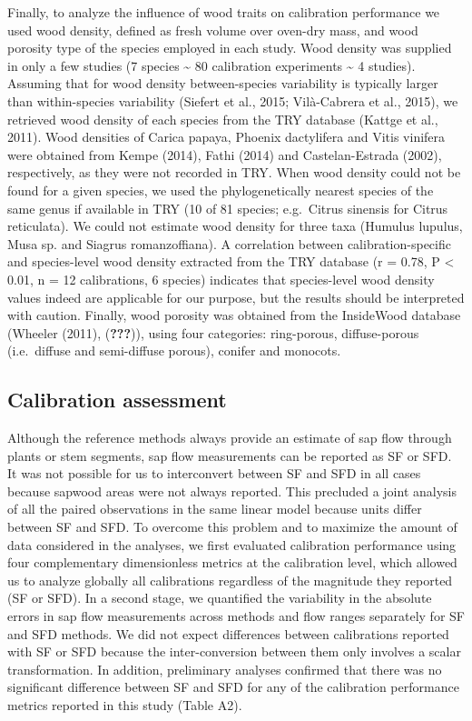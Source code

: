 \documentclass[11pt,twoside]{reedthesis}
\begin{document}
Finally, to analyze the influence of wood traits on calibration
performance we used wood density, defined as fresh volume over oven-dry
mass, and wood porosity type of the species employed in each study. Wood
density was supplied in only a few studies (7 species \textasciitilde{}
80 calibration experiments \textasciitilde{} 4 studies). Assuming that
for wood density between-species variability is typically larger than
within-species variability (Siefert et al., 2015; Vilà-Cabrera et al.,
2015), we retrieved wood density of each species from the TRY database
(Kattge et al., 2011). Wood densities of Carica papaya, Phoenix
dactylifera and Vitis vinifera were obtained from Kempe (2014), Fathi
(2014) and Castelan-Estrada (2002), respectively, as they were not
recorded in TRY. When wood density could not be found for a given
species, we used the phylogenetically nearest species of the same genus
if available in TRY (10 of 81 species; e.g.~Citrus sinensis for Citrus
reticulata). We could not estimate wood density for three taxa (Humulus
lupulus, Musa sp. and Siagrus romanzoffiana). A correlation between
calibration-specific and species-level wood density extracted from the
TRY database (r = 0.78, P \textless{} 0.01, n = 12 calibrations, 6
species) indicates that species-level wood density values indeed are
applicable for our purpose, but the results should be interpreted with
caution. Finally, wood porosity was obtained from the InsideWood
database (Wheeler (2011), ({\textbf{???}})), using four categories:
ring-porous, diffuse-porous (i.e.~diffuse and semi-diffuse porous),
conifer and monocots.\par

\subsection{Calibration assessment}\label{calibration-assessment}

Although the reference methods always provide an estimate of sap flow
through plants or stem segments, sap flow measurements can be reported
as SF or SFD. It was not possible for us to interconvert between SF and
SFD in all cases because sapwood areas were not always reported. This
precluded a joint analysis of all the paired observations in the same
linear model because units differ between SF and SFD. To overcome this
problem and to maximize the amount of data considered in the analyses,
we first evaluated calibration performance using four complementary
dimensionless metrics at the calibration level, which allowed us to
analyze globally all calibrations regardless of the magnitude they
reported (SF or SFD). In a second stage, we quantified the variability
in the absolute errors in sap flow measurements across methods and flow
ranges separately for SF and SFD methods. We did not expect differences
between calibrations reported with SF or SFD because the
inter-conversion between them only involves a scalar transformation. In
addition, preliminary analyses confirmed that there was no significant
difference between SF and SFD for any of the calibration performance
metrics reported in this study (Table A2).\par
\end{document}
